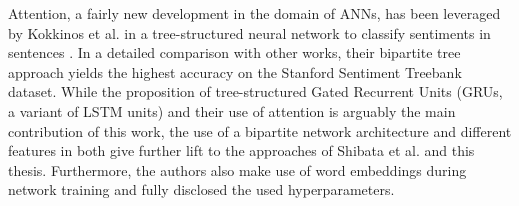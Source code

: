 Attention, a fairly new development in the domain of ANNs, has been leveraged by Kokkinos et al. in a tree-structured neural network to classify sentiments in sentences \cite{kokkinos2017structural}. In a detailed comparison with other works, their bipartite tree approach yields the highest accuracy on the Stanford Sentiment Treebank dataset. While the proposition of tree-structured Gated Recurrent Units (GRUs, a variant of LSTM units) and their use of attention is arguably the main contribution of this work, the use of a bipartite network architecture and different features in both give further lift to the approaches of Shibata et al. and this thesis. Furthermore, the authors also make use of word embeddings during network training and fully disclosed the used hyperparameters.